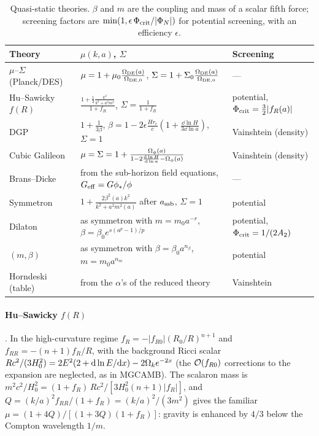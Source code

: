 \begin{table}[htbp]
\centering\small
\caption{Quasi-static theories. $\beta$ and $m$ are the coupling and mass of a scalar fifth force; screening factors
are $\min(1,\epsilon\,\Phi_{\rm crit}/|\Phi_N|)$ for potential screening, with an efficiency $\epsilon$.}
\label{tab:ext-qs}
\begin{tabularx}{\textwidth}{@{}lXX@{}}
\toprule
Theory & $\mu(k,a)$, $\Sigma$ & Screening \\
\midrule
$\mu$--$\Sigma$ (Planck/DES) & $\mu=1+\mu_0\frac{\Omega_{\rm DE}(a)}{\Omega_{\rm DE,0}}$, $\Sigma=1+\Sigma_0\frac{\Omega_{\rm DE}(a)}{\Omega_{\rm DE,0}}$ & --- \\
Hu--Sawicky $f(R)$ & $\frac{1+\frac13\frac{k^2}{k^2+a^2m^2}}{1+f_R}$, $\Sigma=\frac{1}{1+f_R}$ & potential, $\Phi_{\rm crit}=\frac32|f_R(a)|$ \\
DGP & $1+\frac{1}{3\beta}$, $\beta=1-2\epsilon\frac{Hr_c}{c}\left(1+\frac{\dd\ln H}{3\dd\ln a}\right)$, $\Sigma=1$ & Vainshtein (density) \\
Cubic Galileon & $\mu=\Sigma=1+\frac{\Omega_\phi(a)}{1-2\frac{\mathrm{d}\ln H}{\mathrm{d}\ln a}-\Omega_\phi(a)}$ & Vainshtein (density) \\
Brans--Dicke & from the sub-horizon field equations, $G_{\rm eff}=G\phi_*/\phi$ & --- \\
Symmetron & $1+\frac{2\beta^2(a)k^2}{k^2+a^2m^2(a)}$ after $a_{\rm ssb}$, $\Sigma=1$ & potential \\
Dilaton & as symmetron with $m=m_0a^{-r}$, $\beta=\beta_0e^{s(a^p-1)/p}$ & potential, $\Phi_{\rm crit}=1/(2A_2)$ \\
$(m,\beta)$ & as symmetron with $\beta=\beta_0a^{n_\beta}$, $m=m_0a^{n_m}$ & potential \\
Horndeski (table) & from the $\alpha$'s of the reduced theory \cite{Kimura2012} & Vainshtein \\
\bottomrule
\end{tabularx}
\end{table}

\paragraph*{Hu--Sawicky $f(R)$} \cite{HuSawicki2007}. In the high-curvature regime $f_R=-|f_{R0}|(R_0/R)^{n+1}$ and
$f_{RR}=-(n+1)f_R/R$, with the background Ricci scalar $Rc^2/(3H_0^2)=2E^2(2+\mathrm{d}\ln E/\mathrm{d} x)-2\Omega_ke^{-2x}$ (the
$\mathcal{O}(f_{R0})$ corrections to the expansion are neglected, as in MGCAMB). The scalaron mass is
$m^2c^2/H_0^2=(1+f_R)\,Rc^2/[3H_0^2(n+1)|f_R|]$, and $Q=(k/a)^2f_{RR}/(1+f_R)=(k/a)^2/(3m^2)$ gives the familiar
$\mu=(1+4Q)/[(1+3Q)(1+f_R)]$: gravity is enhanced by $4/3$ below the Compton wavelength $1/m$.

